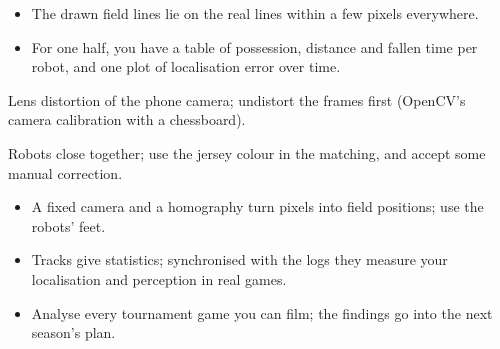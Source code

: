 \begin{checkbox}
\begin{itemize}[nosep]
  \item The drawn field lines lie on the real lines within a few pixels everywhere.
  \item For one half, you have a table of possession, distance and fallen time per robot, and one plot of localisation error over time.
\end{itemize}
\end{checkbox}

\begin{troublebox}
\begin{description}[leftmargin=0.6cm,nosep]
  \item[Lines do not match at the edges] Lens distortion of the phone camera; undistort the frames first (OpenCV's camera calibration with a chessboard).
  \item[Tracks swap between robots] Robots close together; use the jersey colour in the matching, and accept some manual correction.
\end{description}
\end{troublebox}

\begin{keyidea}
\begin{itemize}[nosep]
  \item A fixed camera and a homography turn pixels into field positions; use the robots' feet.
  \item Tracks give statistics; synchronised with the logs they measure your localisation and perception in real games.
  \item Analyse every tournament game you can film; the findings go into the next season's plan.
\end{itemize}
\end{keyidea}

